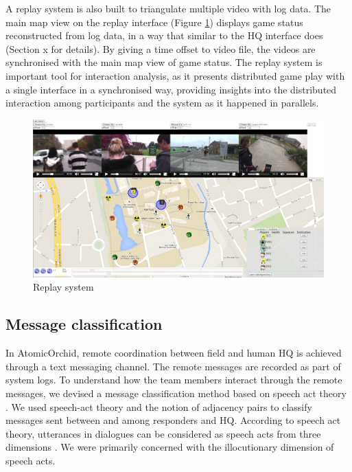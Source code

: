 A replay system is also built to triangulate multiple video with log data. The main map view on the replay interface (Figure \ref{fig:replay}) displays game status reconstructed from log data, in a way that similar to the HQ interface does (Section x for details). By giving a time offset to video file, the videos are synchronised with the main map view of game status. The replay system is important tool for interaction analysis, as it presents distributed game play with a single interface in a synchronised way, providing insights into the distributed interaction among participants and the system as it happened in parallels. \\

\begin{figure}[h]
  \centering
  \includegraphics[width=1\textwidth]{img/methodology/replay}
  \caption{Replay system}
  \label{fig:replay}
\end{figure}

\subsection{Message classification} \label{sec:aprmsg}
In AtomicOrchid, remote coordination between field and human HQ is achieved through a text messaging channel. The remote messages are recorded as part of system logs. To understand how the team members interact through the remote messages, we devised a message classification method based on speech act theory \cite{Searle1976}. We used speech-act theory and the notion of adjacency pairs \cite{Avrahami} to classify messages sent between and among responders and HQ. According to speech act theory, utterances in dialogues can be considered as speech acts from three dimensions \cite{Searle1976}. We were primarily concerned with the illocutionary dimension of speech acts.\\

